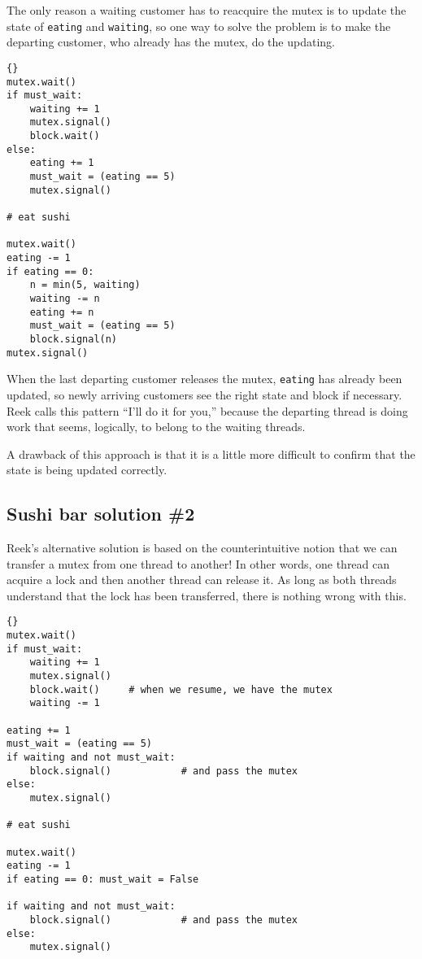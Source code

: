 \documentclass{book}
\newcommand{\clearemptydoublepage}{\newpage\cleardoublepage}
\begin{document}
The only reason a waiting customer has to reacquire the mutex
is to update the state of {\tt eating} and {\tt waiting}, so
one way to solve the problem is to make the departing customer,
who already has the mutex, do the updating.

\begin{lstlisting}[title={Sushi bar solution \#1}]{}
mutex.wait()
if must_wait:
    waiting += 1
    mutex.signal()
    block.wait()
else:
    eating += 1
    must_wait = (eating == 5)
    mutex.signal()

# eat sushi

mutex.wait()
eating -= 1
if eating == 0:
    n = min(5, waiting)
    waiting -= n
    eating += n
    must_wait = (eating == 5)
    block.signal(n)
mutex.signal()
\end{lstlisting}

When the last departing customer releases the mutex, 
{\tt eating} has already been updated, so newly arriving customers
see the right state and block if necessary.  Reek calls this
pattern ``I'll do it for you,'' because the departing thread
is doing work that seems, logically, to belong to the waiting
threads.

A drawback of this approach is that it is a little more difficult
to confirm that the state is being updated correctly.


\clearemptydoublepage
\subsection {Sushi bar solution \#2}

Reek's alternative solution is based on the counterintuitive
notion that we can transfer a mutex from one thread to another!
In other words, one thread can acquire a lock and then another
thread can release it.  As long as both threads understand
that the lock has been transferred, there is nothing wrong with
this.

\begin{lstlisting}[title={Sushi bar solution \#2}]{}
mutex.wait()
if must_wait:
    waiting += 1
    mutex.signal()
    block.wait()     # when we resume, we have the mutex
    waiting -= 1

eating += 1
must_wait = (eating == 5)
if waiting and not must_wait:
    block.signal()            # and pass the mutex
else:
    mutex.signal()

# eat sushi

mutex.wait()
eating -= 1
if eating == 0: must_wait = False

if waiting and not must_wait:
    block.signal()            # and pass the mutex
else:
    mutex.signal()
\end{lstlisting}
\end{document}
